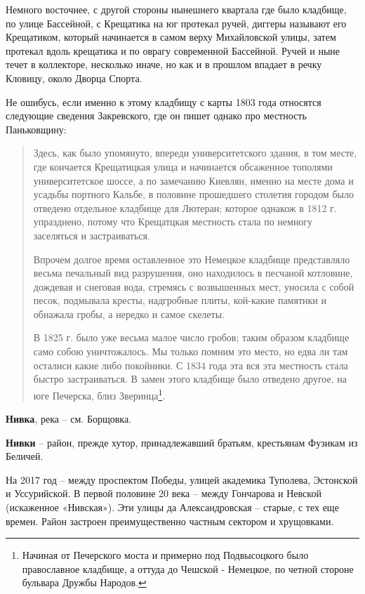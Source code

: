Немного восточнее, с другой стороны нынешнего квартала где было кладбище, по улице Бассейной, с Крещатика на юг протекал ручей, диггеры называют его Крещатиком, который начинается в самом верху Михайловской улицы, затем протекал вдоль крещатика и по оврагу современной Бассейной. Ручей и ныне течет в коллекторе, несколько иначе, но как и в прошлом впадает в речку Кловицу, около Дворца Спорта.
  
Не ошибусь, если именно к этому кладбищу с карты 1803 года относятся следующие сведения Закревского, где он пишет однако про местность Паньковщину:

\begin{quotation}
Здесь, как было упомянуто, впереди университетского здания, в том месте, где кончается Крещатицкая улица и начинается обсаженное тополями университетское шоссе, а по замечанию Киевлян, именно на месте дома и усадьбы портного Кальбе, в половине прошедшего столетия городом было отведено отдельное кладбище для Лютеран; которое однакож в 1812 г. упразднено, потому что Крещатцкая местность стала по немногу заселяться и застраиваться. 

Впрочем долгое время оставленное это Немецкое кладбище представляло весьма печальный вид разрушения, оно находилось в песчаной котловине, дождевая и снеговая вода, стремясь с возвышенных мест, уносила с собой песок, подмывала кресты, надгробные плиты, кой-какие памятнки и обнажала гробы, а нередко и самое скелеты.

В 1825 г. было уже весьма малое число гробов; таким образом кладбище само собою уничтожалось. Мы только помним это место, но едва ли там осталиси какие либо покойники. С 1834 года эта вся эта местность стала быстро застраиваться. В замен этого кладбище было отведено другое, на юге Печерска, близ Зверинца\footnote{Начиная от Печерского моста и примерно под Подвысоцкого было православное кладбище, а оттуда до Чешской - Немецкое, по четной стороне бульвара Дружбы Народов.}.
\end{quotation}

\medskip


\medskip

\textbf{Нивка}, река – см. Борщовка.\\


\medskip

\textbf{Нивки} – район, прежде хутор, принадлежавший братьям, крестьянам Фузикам из Беличей. 

На 2017 год – между проспектом Победы, улицей академика Туполева, Эстонской и Уссурийской. В первой половине 20 века – между Гончарова и Невской (искаженное «Нивская»). Эти улицы да Александровская – старые, с тех еще времен. Район застроен преимущественно частным сектором и хрущовками.\\


